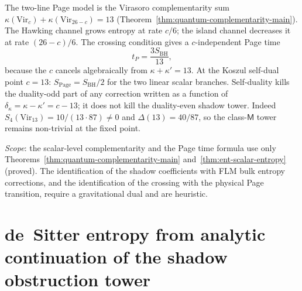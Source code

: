 \begin{remark}
\label{rem:page-curve-complementarity}
The two-line Page model is the Virasoro complementarity sum
$\kappa(\mathrm{Vir}_c) + \kappa(\mathrm{Vir}_{26-c}) = 13$
(Theorem~\ref{thm:quantum-complementarity-main}).
The Hawking channel grows entropy at rate $c/6$;
the island channel decreases it at rate $(26-c)/6$.
The crossing condition gives a $c$-independent Page time
\[
 t_P = \frac{3 S_{\mathrm{BH}}}{13},
\]
because the $c$ cancels algebraically from
$\kappa + \kappa' = 13$.
At the Koszul self-dual point $c = 13$:
$S_{\mathrm{Page}} = S_{\mathrm{BH}}/2$
for the two linear scalar branches.  Self-duality kills the
duality-odd part of any correction written as a function of
$\delta_\kappa=\kappa-\kappa'=c-13$; it does not kill the
duality-even shadow tower.  Indeed
$S_4(\mathrm{Vir}_{13})=10/(13\cdot87)\neq0$ and
$\Delta(13)=40/87$, so the class-$\mathsf M$ tower remains
non-trivial at the fixed point.

\emph{Scope}: the scalar-level complementarity and
the Page time formula use only
Theorems~\ref{thm:quantum-complementarity-main}
and~\ref{thm:ent-scalar-entropy} (proved).
The identification of the shadow coefficients with FLM bulk
entropy corrections, and the identification of the crossing with
the physical Page transition, require a gravitational dual and are
heuristic.
\end{remark}

%
%

\section{de~Sitter entropy from analytic continuation of the shadow obstruction tower}
\label{sec:ent-desitter}

